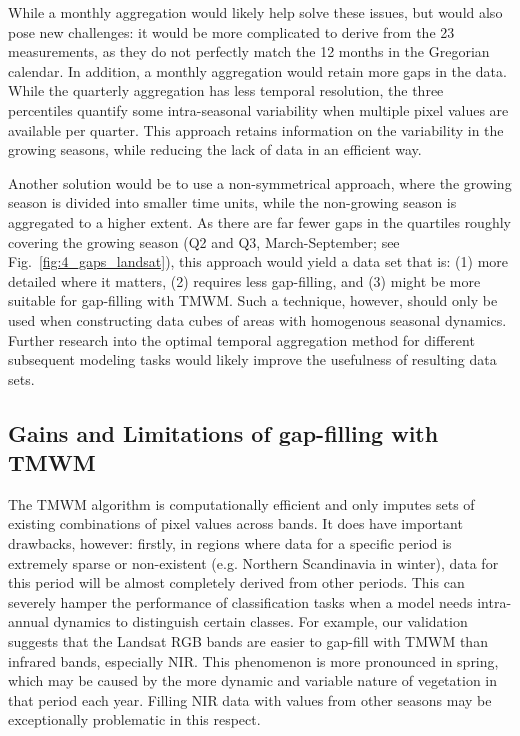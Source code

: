 While a monthly aggregation would likely help solve these issues, but would also pose new challenges: it would be more complicated to derive from the 23 measurements, as they do not perfectly match the 12 months in the Gregorian calendar. In addition, a monthly aggregation would retain more gaps in the data. While the quarterly aggregation has less temporal resolution, the three percentiles quantify some intra-seasonal variability when multiple pixel values are available per quarter. This approach retains information on the variability in the growing seasons, while reducing the lack of data in an efficient way. 

Another solution would be to use a non-symmetrical approach, where the growing season is divided into smaller time units, while the non-growing season is aggregated to a higher extent. As there are far fewer gaps in the quartiles roughly covering the growing season (Q2 and Q3, March-September; see Fig.\@~\ref{fig:4_gaps_landsat}), this approach would yield a data set that is: (1) more detailed where it matters, (2) requires less gap-filling, and (3) might be more suitable for gap-filling with TMWM. Such a technique, however, should only be used when constructing data cubes of areas with homogenous seasonal dynamics. Further research into the optimal temporal aggregation method for different subsequent modeling tasks would likely improve the usefulness of resulting data sets.

\subsection*{Gains and Limitations of gap-filling with TMWM}

The TMWM algorithm is computationally efficient and only imputes sets of existing combinations of pixel values across bands. It does have important drawbacks, however: firstly, in regions where data for a specific period is extremely sparse or non-existent (e.g. Northern Scandinavia in winter), data for this period will be almost completely derived from other periods. This can severely hamper the performance of classification tasks when a model needs intra-annual dynamics to distinguish certain classes. For example, our validation suggests that the Landsat RGB bands are easier to gap-fill with TMWM than infrared bands, especially NIR. This phenomenon is more pronounced in spring, which may be caused by the more dynamic and variable nature of vegetation in that period each year. Filling NIR data with values from other seasons may be exceptionally problematic in this respect. 

